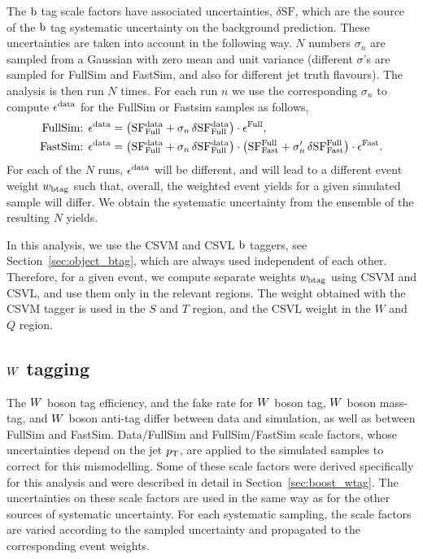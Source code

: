The $\mathrm{b}$ tag scale factors have associated uncertainties, $\delta\mathrm{SF}$, which are the
source of the $\mathrm{b}$ tag systematic uncertainty on the background prediction. 
These uncertainties are taken into account in the following way.
$N$ numbers $\sigma_n$ are sampled from a Gaussian with zero mean and unit variance
(different $\sigma$'s are sampled for FullSim and FastSim, and also for different jet truth
flavours). The analysis is then run $N$ times. For each run $n$ we use the corresponding $\sigma_n$
to compute $\epsilon^{\rm data}$ for the FullSim or Fastsim samples as follows, 
\begin{align}
\textrm{FullSim: } \epsilon^{\rm data} &= \left(\mathrm{SF^{data}_{Full}} + \sigma_n \, \delta
\mathrm{SF^{data}_{Full}} \right) \cdot \epsilon^{\rm Full} , \\
\textrm{FastSim: } \epsilon^{\rm data} &= \left(\mathrm{SF^{data}_{Full}} + \sigma_n \, \delta
\mathrm{SF^{data}_{Full}}\right) \cdot \left(\mathrm{SF^{Full}_{Fast}} + \sigma_n' \, \delta
\mathrm{SF^{Full}_{Fast}} \right) \cdot \epsilon^{\rm Fast}.
\end{align}
For each of the $N$ runs, $\epsilon^{\rm data}$ will be different, and will lead to a different
event weight $w_{\rm btag}$ such that, overall, the weighted event yields for a given simulated
sample will differ. 
We obtain the systematic uncertainty from the ensemble of the resulting $N$ yields.

In this analysis, we use the CSVM and CSVL $\mathrm{b}$ taggers, see Section~\ref{sec:object_btag}, which
are always used independent of each other. Therefore, for a given event, we compute separate weights
$w_{\rm btag}$ using CSVM and CSVL, and use them only in the relevant regions. The weight obtained
with the CSVM tagger is used in the $S$ and $T$ region, and the CSVL weight in the $W$ and $Q$
region.

\subsection{\texorpdfstring{$W$}{W} tagging} 

The $W$ boson tag efficiency, and the fake rate for $W$ boson tag, $W$ boson mass-tag, and $W$
boson anti-tag differ between data and simulation, as well as between FullSim and FastSim. 
Data/FullSim and FullSim/FastSim scale factors, whose uncertainties depend on the jet $p_{\mathrm{T}}$,
are applied to the simulated samples to correct for this mismodelling.
Some of these scale factors were derived specifically for this analysis and were described in detail
in Section~\ref{sec:boost_wtag}.
The uncertainties on these scale factors are used in the same way as for the other sources of
systematic uncertainty. For each systematic sampling, the scale factors are varied according to the
sampled uncertainty and propagated to the corresponding event weights.

